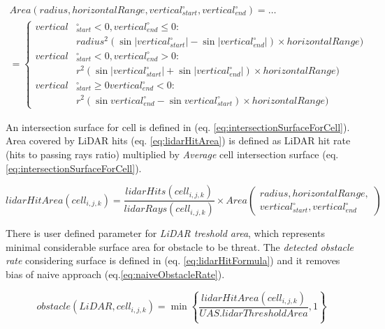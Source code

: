 \begin{multline}\label{eq:intersectionSurfaceForCell}
    Area(radius,horizontal Range, vertical_{start}^\circ, vertical_{end}^\circ) =\dots\\ 
    =\left\{
    \begin{aligned}
        vertical&_{start}^\circ <0, vertical_{end}^\circ \le 0 :\\ 
            &radius^2(\sin |vertical_{start}^\circ| - \sin|vertical_{end}^\circ|)\times horizontal Range)\\
         vertical&_{start}^\circ <0, vertical_{end}^\circ > 0   :\\
            & r^2(\sin |vertical_{start}^\circ| + \sin|vertical_{end}^\circ|)\times horizontal Range)\\
         vertical&_{start}^\circ \ge 0 vertical_{end}^\circ < 0 :\\
            & r^2(\sin vertical_{end}^\circ- \sin vertical_{start}^\circ)\times horizontal Range)
    \end{aligned}
    \right.
\end{multline}

\noindent An intersection surface for cell is defined in (eq. \ref{eq:intersectionSurfaceForCell}). Area covered by LiDAR hits (eq. \ref{eq:lidarHitArea}) is defined as LiDAR hit rate (hits to passing rays ratio) multiplied by \emph{Average} cell intersection surface (eq. \ref{eq:intersectionSurfaceForCell}).

\begin{equation}\label{eq:lidarHitArea}
    lidar Hit Area(cell_{i,j,k}) = \frac{lidar Hits(cell_{i,j,k})}{lidar Rays(cell_{i,j,k})} \times Area\left(\begin{gathered}radius,horizontal Range,\\ vertical_{start}^\circ, vertical_{end}^\circ\end{gathered}\right)
\end{equation}

\noindent There is user defined parameter for \emph{LiDAR treshold area}, which represents minimal considerable surface area for obstacle to be threat. The \emph{detected obstacle rate} considering surface is defined in (eq. \ref{eq:lidarHitFormula}) and it removes bias of naive approach (eq.\ref{eq:naiveObstacleRate}).

\begin{equation}\label{eq:lidarHitFormula}
    obstacle(LiDAR,cell_{i,j,k})=\min\left\{\frac{lidar Hit Area(cell_{i,j,k})}{UAS.lidar Threshold Area},1\right\}
\end{equation}



